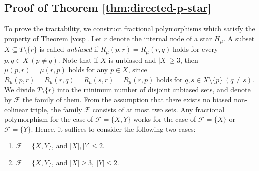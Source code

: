 \documentclass[11pt]{article}
\theoremstyle{definition}
\begin{document}
\subsection{Proof of Theorem \ref{thm:directed-p-star}}
To prove the tractability, we construct fractional polymorphisms which satisfy the property of Theorem \ref{vcsp}. Let $r$ denote the internal node of a star $H_\mu$. A subset $X\subseteq T\setminus \{r\}$ is called \textit{unbiased} if $R_{\mu}(p,r)=R_{\mu}(r,q)$ holds for every $p,q\in X\ (p\neq q)$. Note that if $X$ is unbiased and $|X|\geq 3$, then $\mu(p,r)=\mu(r,p)$ holds for any $p\in X$, since $R_\mu(p,r)=R_\mu(r,q)=R_\mu(s,r)=R_\mu(r,p)$ holds for $q,s\in X\setminus \{p\}\ (q\neq s)$. We divide $T\setminus \{r\}$ into the minimum number of disjoint unbiased sets, and denote by $\mathcal{F}$ the family of them. From the assumption that there exists no biased non-colinear triple, the family $\mathcal{F}$ consists of at most two sets. Any fractional polymorphism for the case of $\mathcal{F}=\{X,Y\}$ works for the case of $\mathcal{F}=\{X\}$ or $\mathcal{F}=\{Y\}$. Hence, it suffices to consider the following two cases:
\begin{enumerate}[label=(\roman*),ref=\roman*]
    \item $\mathcal{F}=\{X,Y\}$, and $|X|, |Y|\leq 2$.
    \label{thm6:case1}
    \item $\mathcal{F}=\{X,Y\}$, and $|X|\geq 3,\ |Y|\leq 2$.
    \label{thm6:case2}
\end{enumerate}
\end{document}

